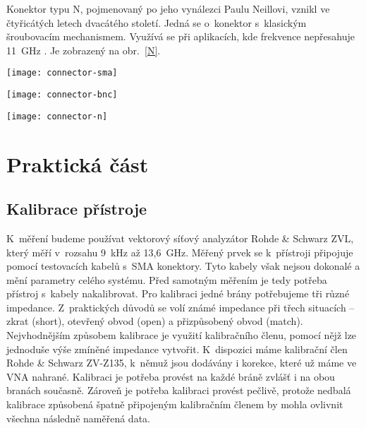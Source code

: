 \documentclass{protokol}
\begin{document}
Konektor typu N, pojmenovaný po jeho vynálezci Paulu Neillovi,
vznikl ve čtyřicátých letech dvacátého století.
Jedná se o~konektor s~klasickým šroubovacím mechanismem.
Využívá se při aplikacích, kde frekvence nepřesahuje 11~GHz \cite{rfhandbook}.
Je zobrazený na obr.~\ref{N}.

\begin{center}
	\captionsetup{justification=centering}
	\begin{minipage}{0.32\textwidth}
		\captionsetup{type=figure}
		\texttt{[image: connector-sma]}
		\label{SMA}
	\end{minipage}
	\begin{minipage}{0.40\linewidth}
		\captionsetup{type=figure}
		\texttt{[image: connector-bnc]}
		\label{BNC}
	\end{minipage}
	\begin{minipage}{0.29\textwidth}
		\captionsetup{type=figure}
		\texttt{[image: connector-n]}
		\label{N}
	\end{minipage}
\end{center}

\section{Praktická část}
\subsection{Kalibrace přístroje}
K~měření budeme používat vektorový síťový analyzátor Rohde \& Schwarz ZVL,
který měří v~rozsahu 9~kHz až 13,6~GHz.
Měřený prvek se k~přístroji připojuje pomocí testovacích kabelů s~SMA konektory.
Tyto kabely však nejsou dokonalé a mění parametry celého systému.
Před samotným měřením je tedy potřeba přístroj s~kabely nakalibrovat.
Pro kalibraci jedné brány potřebujeme tři různé impedance.
Z~praktických důvodů se volí známé impedance při třech situacích -- zkrat (short),
otevřený obvod (open) a přizpůsobený obvod (match).
Nejvhodnějším způsobem kalibrace je využití kalibračního členu,
pomocí nějž lze jednoduše výše zmíněné impedance vytvořit.
K~dispozici máme kalibrační člen Rohde \& Schwarz ZV-Z135,
k~němuž jsou dodávány i korekce, které už máme ve VNA nahrané.
Kalibraci je potřeba provést na každé bráně zvlášť i na obou branách současně.
Zároveň je potřeba kalibraci provést pečlivě,
protože nedbalá kalibrace způsobená špatně připojeným kalibračním členem
by mohla ovlivnit všechna následně naměřená data.
\end{document}
